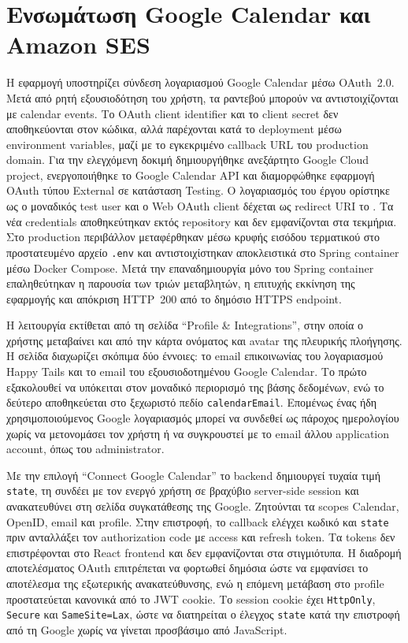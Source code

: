 \section{Ενσωμάτωση Google Calendar και Amazon SES}
Η εφαρμογή υποστηρίζει σύνδεση λογαριασμού Google Calendar μέσω OAuth~2.0.
Μετά από ρητή εξουσιοδότηση του χρήστη, τα ραντεβού μπορούν να
αντιστοιχίζονται με calendar events. Το OAuth client identifier και το client
secret δεν αποθηκεύονται στον κώδικα, αλλά παρέχονται κατά το deployment μέσω
environment variables, μαζί με το εγκεκριμένο callback URL του production
domain. Για την ελεγχόμενη δοκιμή δημιουργήθηκε ανεξάρτητο Google Cloud
project, ενεργοποιήθηκε το Google Calendar API και διαμορφώθηκε εφαρμογή
OAuth τύπου External σε κατάσταση Testing. Ο λογαριασμός του έργου ορίστηκε
ως ο μοναδικός test user και ο Web OAuth client δέχεται ως redirect URI το
. Τα νέα
credentials αποθηκεύτηκαν εκτός repository και δεν εμφανίζονται στα τεκμήρια.
Στο production περιβάλλον μεταφέρθηκαν μέσω κρυφής εισόδου τερματικού στο
προστατευμένο αρχείο \texttt{.env} και αντιστοιχίστηκαν αποκλειστικά στο Spring
container μέσω Docker Compose. Μετά την επαναδημιουργία μόνο του Spring
container επαληθεύτηκαν η παρουσία των τριών μεταβλητών, η επιτυχής εκκίνηση
της εφαρμογής και απόκριση HTTP~200 από το δημόσιο HTTPS endpoint.

Η λειτουργία εκτίθεται από τη σελίδα \enquote{Profile \& Integrations}, στην
οποία ο χρήστης μεταβαίνει και από την κάρτα ονόματος και avatar της
πλευρικής πλοήγησης. Η σελίδα διαχωρίζει σκόπιμα δύο έννοιες: το email
επικοινωνίας του λογαριασμού Happy Tails και το email του εξουσιοδοτημένου
Google Calendar. Το πρώτο εξακολουθεί να υπόκειται στον μοναδικό περιορισμό
της βάσης δεδομένων, ενώ το δεύτερο αποθηκεύεται στο ξεχωριστό πεδίο
\texttt{calendarEmail}. Επομένως ένας ήδη χρησιμοποιούμενος Google λογαριασμός
μπορεί να συνδεθεί ως πάροχος ημερολογίου χωρίς να μετονομάσει τον χρήστη ή να
συγκρουστεί με το email άλλου application account, όπως του administrator.

Με την επιλογή \enquote{Connect Google Calendar} το backend δημιουργεί τυχαία
τιμή \texttt{state}, τη συνδέει με τον ενεργό χρήστη σε βραχύβιο server-side
session και ανακατευθύνει στη σελίδα συγκατάθεσης της Google. Ζητούνται τα
scopes Calendar, OpenID, email και profile. Στην επιστροφή, το callback
ελέγχει κωδικό και \texttt{state} πριν ανταλλάξει τον authorization code με
access και refresh token. Τα tokens δεν επιστρέφονται στο React frontend και
δεν εμφανίζονται στα στιγμιότυπα. Η διαδρομή αποτελέσματος OAuth επιτρέπεται
να φορτωθεί δημόσια ώστε να εμφανίσει το αποτέλεσμα της εξωτερικής
ανακατεύθυνσης, ενώ η επόμενη μετάβαση στο profile προστατεύεται κανονικά από
το JWT cookie. Το session cookie έχει \texttt{HttpOnly}, \texttt{Secure} και
\texttt{SameSite=Lax}, ώστε να διατηρείται ο έλεγχος \texttt{state} κατά την
επιστροφή από τη Google χωρίς να γίνεται προσβάσιμο από JavaScript.

